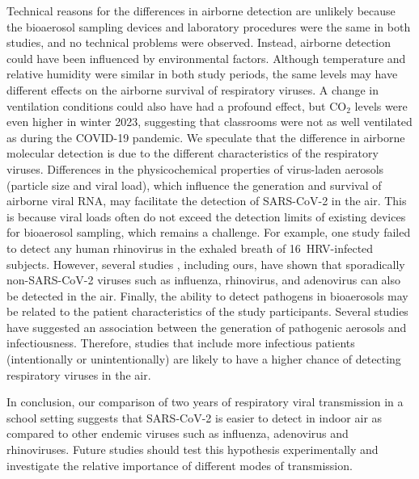 \documentclass[fleqn,11pt]{wlscirep}
\begin{document}
Technical reasons for the differences in airborne detection are unlikely because the bioaerosol sampling devices and laboratory procedures were the same in both studies, and no technical problems were observed. Instead, airborne detection could have been influenced by environmental factors. Although temperature and relative humidity were similar in both study periods, the same levels may have different effects on the airborne survival of respiratory viruses\cite{Tellier2009JTRSI,Davis1971AM}. A change in ventilation conditions could also have had a profound effect, but CO$_2$ levels were even higher in winter 2023, suggesting that classrooms were not as well ventilated as during the COVID-19 pandemic. We speculate that the difference in airborne molecular detection is due to the different characteristics of the respiratory viruses. Differences in the physicochemical properties of virus-laden aerosols (\eg particle size and viral load), which influence the generation and survival of airborne viral RNA\cite{Wang2021}, may facilitate the detection of SARS-CoV-2 in the air. This is because viral loads often do not exceed the detection limits of existing devices for bioaerosol sampling, which remains a challenge\cite{Belser2023PLOSPath}. For example, one study failed to detect any human rhinovirus in the exhaled breath of 16~HRV-infected subjects\cite{Fabian2011JAMPDD}. However, several studies , including ours, have shown that sporadically non-SARS-CoV-2 viruses such as influenza, rhinovirus, and adenovirus can also be detected in the air\cite{Bischoff2013JID,Pan2017mSphere,Myatt2004AJRCCM}. Finally, the ability to detect pathogens in bioaerosols may be related to the patient characteristics of the study participants. Several studies have suggested an association between the generation of pathogenic aerosols and infectiousness\cite{Leung2020NatMed,Bischoff2013JID}. Therefore, studies that include more infectious patients (intentionally or unintentionally) are likely to have a higher chance of detecting respiratory viruses in the air. 

In conclusion, our comparison of two years of respiratory viral transmission in a school setting suggests that SARS-CoV-2 is easier to detect in indoor air as compared to other endemic viruses such as influenza, adenovirus and rhinoviruses. Future studies should test this hypothesis experimentally and investigate the relative importance of different modes of transmission.   
\end{document}
